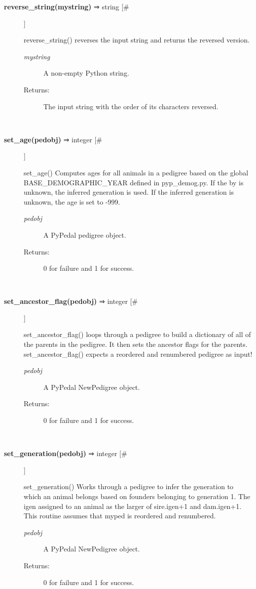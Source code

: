 \begin{description}
\item[\textbf{reverse\_string(mystring)}
 ⇒ string [\#]]

 reverse\_string() reverses the input string and returns the reversed version.
\begin{description}
\item[\emph{mystring}
] A non-empty Python string.
\item[Returns:] The input string with the order of its characters reversed.

\end{description}
\\ 

\item[\textbf{set\_age(pedobj)}
 ⇒ integer [\#]]

 set\_age() Computes ages for all animals in a pedigree based on the global BASE\_DEMOGRAPHIC\_YEAR defined in pyp\_demog.py. If the by is unknown, the inferred generation is used. If the inferred generation is unknown, the age is set to -999.
\begin{description}
\item[\emph{pedobj}
] A PyPedal pedigree object.
\item[Returns:] 0 for failure and 1 for success.

\end{description}
\\ 

\item[\textbf{set\_ancestor\_flag(pedobj)}
 ⇒ integer [\#]]

 set\_ancestor\_flag() loops through a pedigree to build a dictionary of all of the parents in the pedigree. It then sets the ancestor flags for the parents. set\_ancestor\_flag() expects a reordered and renumbered pedigree as input!
\begin{description}
\item[\emph{pedobj}
] A PyPedal NewPedigree object.
\item[Returns:] 0 for failure and 1 for success.

\end{description}
\\ 

\item[\textbf{set\_generation(pedobj)}
 ⇒ integer [\#]]

 set\_generation() Works through a pedigree to infer the generation to which an animal belongs based on founders belonging to generation 1. The igen assigned to an animal as the larger of sire.igen+1 and dam.igen+1. This routine assumes that myped is reordered and renumbered.
\begin{description}
\item[\emph{pedobj}
] A PyPedal NewPedigree object.
\item[Returns:] 0 for failure and 1 for success.


\end{description}
\end{description}
